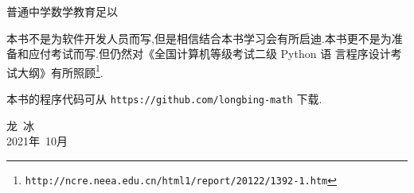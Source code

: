 普通中学数学教育足以



本书不是为软件开发人员而写,但是相信结合本书学习会有所启迪.本书更不是为准备和应付考试而写.但仍然对《全国计算机等级考试二级 Python 语 言程序设计考试大纲》有所照顾\footnote{\texttt{http://ncre.neea.edu.cn/html1/report/20122/1392-1.htm}}.

本书的程序代码可从 \verb|https://github.com/longbing-math| 下载.


{\kaishu
	\begin{center}
		\hspace*{88mm}龙\,   冰\\
		\hspace*{88mm}2021年~10月
	\end{center}
}

%

